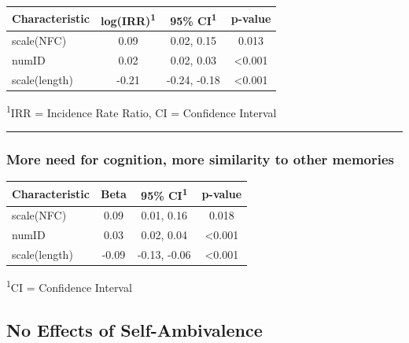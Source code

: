 \documentclass[
  .7em,
  letterpaper,
  DIV=11,
  numbers=noendperiod]{scrartcl}
\begin{document}
\captionsetup[table]{labelformat=empty,skip=1pt}
\setlength{\LTpost}{0mm}
\begin{longtable}{lccc}
\toprule
\textbf{Characteristic} & \textbf{log(IRR)}\textsuperscript{1} & \textbf{95\% CI}\textsuperscript{1} & \textbf{p-value} \\ 
\midrule
scale(NFC) & 0.09 & 0.02, 0.15 & 0.013 \\ 
numID & 0.02 & 0.02, 0.03 & <0.001 \\ 
scale(length) & -0.21 & -0.24, -0.18 & <0.001 \\ 
\bottomrule
\end{longtable}
\begin{minipage}{\linewidth}
\textsuperscript{1}IRR = Incidence Rate Ratio, CI = Confidence Interval\\
\end{minipage}

\begin{center}\rule{0.5\linewidth}{0.5pt}\end{center}

\hypertarget{more-need-for-cognition-more-similarity-to-other-memories}{%
\subsubsection{More need for cognition, more similarity to other
memories}\label{more-need-for-cognition-more-similarity-to-other-memories}}

\captionsetup[table]{labelformat=empty,skip=1pt}
\setlength{\LTpost}{0mm}
\begin{longtable}{lccc}
\toprule
\textbf{Characteristic} & \textbf{Beta} & \textbf{95\% CI}\textsuperscript{1} & \textbf{p-value} \\ 
\midrule
scale(NFC) & 0.09 & 0.01, 0.16 & 0.018 \\ 
numID & 0.03 & 0.02, 0.04 & <0.001 \\ 
scale(length) & -0.09 & -0.13, -0.06 & <0.001 \\ 
\bottomrule
\end{longtable}
\begin{minipage}{\linewidth}
\textsuperscript{1}CI = Confidence Interval\\
\end{minipage}

\hypertarget{no-effects-of-self-ambivalence}{%
\subsection{No Effects of
Self-Ambivalence}\label{no-effects-of-self-ambivalence}}
\end{document}
